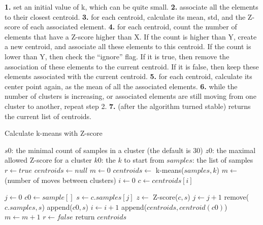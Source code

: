 \documentclass[12pt]{article}
\begin{document}
\textbf{1.} set an initial value of k, which can be quite small. \newline
\textbf{2.} associate all the elements to their closest centroid. \newline
\textbf{3.} for each centroid, calculate its mean, std, and the Z-score of each associated element. \newline
\textbf{4.} for each centroid, count the number of elements that have a Z-score higher than X. If the count is higher than Y, create a new centroid, and associate all these elements to this centroid.
If the count is lower than Y, then check the “ignore” flag. If it is true, then remove the association of these elements to the current centroid. If it is false, then keep these elements associated with the current centroid. \newline
\textbf{5.} for each centroid, calculate its center point again, as the mean of all the associated elements. \newline
\textbf{6.} while the number of clusters is increasing, or associated elements are still moving from one cluster to another, repeat step 2. \newline
\textbf{7.} (after the algorithm turned stable) returns the current list of centroids. \newline
\newpage
\begin{algorithm}
\caption{Calculate k-means with Z-score}
\begin{algorithmic} 
\REQUIRE
\STATE $s0$: the minimal count of samples in a cluster (the default is 30)
\STATE $z0$: the maximal allowed Z-score for a cluster
\STATE $k0$: the $k$ to start from
\STATE $samples$: the list of samples
\ENSURE
\STATE $r \leftarrow true$
\newline
\STATE $centroids \leftarrow null$
\STATE $m \leftarrow 0$
\STATE $centroids \leftarrow $ k-means($samples, k$)
\STATE $m \leftarrow $ (number of moves between clusters)
\newline
\STATE $i \leftarrow 0$
\STATE $c \leftarrow centroids[i]$

\STATE $j \leftarrow 0$
\STATE $c0 \leftarrow sample[]$
\STATE $s \leftarrow c.samples[j]$
\STATE $z \leftarrow $ Z-score($c,s$)
\STATE $j \leftarrow j+1$
\STATE remove($c.samples,s$)
\STATE append($c0,s$)
\ENDIF
\STATE $i \leftarrow i+1$
\ENDWHILE
{}
\STATE append($centroids,centroid(c0)$)
\newline
\STATE $m \leftarrow m+1$
\ENDIF
\ENDWHILE
{}
\STATE $r \leftarrow false$
\ENDIF
\ENDWHILE
\STATE return $centroids$
\end{algorithmic}
\end{algorithm}
\end{document}
